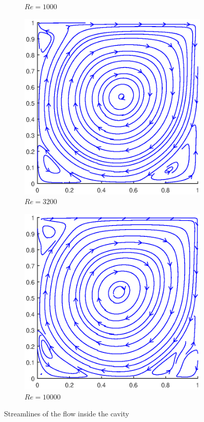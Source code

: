 \begin{figure}[h]
\begin{subfigure}{0.5\textwidth}
		\caption{$Re=1000$}
	\end{subfigure}
	\begin{subfigure}{0.5\textwidth}
		\includegraphics[scale=0.61]{DrivenCavity/3200}
		\caption{$Re=3200$}
	\end{subfigure}%
	\begin{subfigure}{0.5\textwidth}
		\includegraphics[scale=0.61]{DrivenCavity/10000}
		\caption{$Re=10000$}
	\end{subfigure}
	\caption{Streamlines of the flow inside the cavity}
	\label{DrivenStreamlines}
\end{figure}


